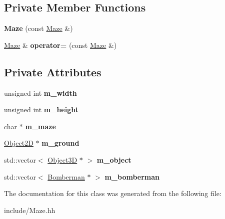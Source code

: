 \subsection*{Private Member Functions}
\begin{DoxyCompactItemize}
\item 
\hypertarget{class_maze_aa9e449e2191a6e3db0594df71fe467c4}{}{\bfseries Maze} (const \hyperlink{class_maze}{Maze} \&)\label{class_maze_aa9e449e2191a6e3db0594df71fe467c4}

\item 
\hypertarget{class_maze_ab1a1ee2737331545a6d84b3a6d6e5e68}{}\hyperlink{class_maze}{Maze} \& {\bfseries operator=} (const \hyperlink{class_maze}{Maze} \&)\label{class_maze_ab1a1ee2737331545a6d84b3a6d6e5e68}

\end{DoxyCompactItemize}
\subsection*{Private Attributes}
\begin{DoxyCompactItemize}
\item 
\hypertarget{class_maze_a815c37c7716bba0238caab69227cb493}{}unsigned int {\bfseries m\+\_\+width}\label{class_maze_a815c37c7716bba0238caab69227cb493}

\item 
\hypertarget{class_maze_a2b0951c80da6db88b80d373ce6e6a64e}{}unsigned int {\bfseries m\+\_\+height}\label{class_maze_a2b0951c80da6db88b80d373ce6e6a64e}

\item 
\hypertarget{class_maze_ad1b7db5256b4d4c2849c644430c18d85}{}char $\ast$ {\bfseries m\+\_\+maze}\label{class_maze_ad1b7db5256b4d4c2849c644430c18d85}

\item 
\hypertarget{class_maze_a66283068d9d33281e844260c93085ab1}{}\hyperlink{class_object2_d}{Object2\+D} $\ast$ {\bfseries m\+\_\+ground}\label{class_maze_a66283068d9d33281e844260c93085ab1}

\item 
\hypertarget{class_maze_afa529b10f1f4135122a2490892aa8640}{}std\+::vector$<$ \hyperlink{class_object3_d}{Object3\+D} $\ast$ $>$ {\bfseries m\+\_\+object}\label{class_maze_afa529b10f1f4135122a2490892aa8640}

\item 
\hypertarget{class_maze_a6582a2e9ade8689448cbe0fa71eaac2d}{}std\+::vector$<$ \hyperlink{class_bomberman}{Bomberman} $\ast$ $>$ {\bfseries m\+\_\+bomberman}\label{class_maze_a6582a2e9ade8689448cbe0fa71eaac2d}

\end{DoxyCompactItemize}


The documentation for this class was generated from the following file\+:\begin{DoxyCompactItemize}
\item 
include/Maze.\+hh\end{DoxyCompactItemize}
